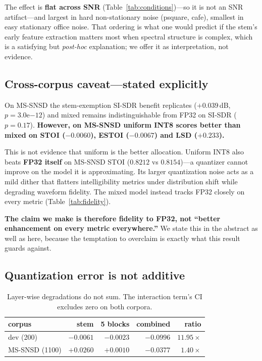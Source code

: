 \documentclass[conference]{IEEEtran}
\begin{document}
The effect is \textbf{flat across SNR} (Table~\ref{tab:conditions})---so it is not an SNR
artifact---and largest in hard non-stationary noise (psquare, cafe), smallest in easy stationary
office noise. That ordering is what one would predict if the stem's early feature extraction
matters most when spectral structure is complex, which is a satisfying but \emph{post-hoc}
explanation; we offer it as interpretation, not evidence.

\subsection{Cross-corpus caveat---stated explicitly}
\label{sec:crosscorpus}

On MS-SNSD the stem-exemption SI-SDR benefit replicates ($+0.039$\,dB, $p = 3.0\mathrm{e}{-12}$)
and mixed remains indistinguishable from FP32 on SI-SDR ($p = 0.17$). \textbf{However, on MS-SNSD
uniform INT8 scores better than mixed on STOI ($-0.0060$), ESTOI ($-0.0067$) and LSD ($+0.233$).}

This is not evidence that uniform is the better allocation. Uniform INT8 also beats \textbf{FP32
itself} on MS-SNSD STOI ($0.8212$ vs $0.8154$)---a quantizer cannot improve on the model it is
approximating. Its larger quantization noise acts as a mild dither that flatters intelligibility
metrics under distribution shift while degrading waveform fidelity. The mixed model instead tracks
FP32 closely on every metric (Table~\ref{tab:fidelity}).

\textbf{The claim we make is therefore fidelity to FP32, not ``better enhancement on every metric
everywhere.''} We state this in the abstract as well as here, because the temptation to overclaim
is exactly what this result guards against.

\subsection{Quantization error is not additive}
\label{sec:additive}

\begin{table}[t]
\centering
\caption{Layer-wise degradations do not sum. The interaction term's CI excludes zero on both
corpora.}
\label{tab:additive}
\begin{tabular}{lrrrr}
\toprule
corpus & stem & 5 blocks & combined & ratio \\
\midrule
dev (200) & $-0.0061$ & $-0.0023$ & $-0.0996$ & $\mathbf{11.95\times}$ \\
MS-SNSD (1100) & $+0.0260$ & $+0.0010$ & $-0.0377$ & $1.40\times$ \\
\bottomrule
\end{tabular}
\end{table}
\end{document}
